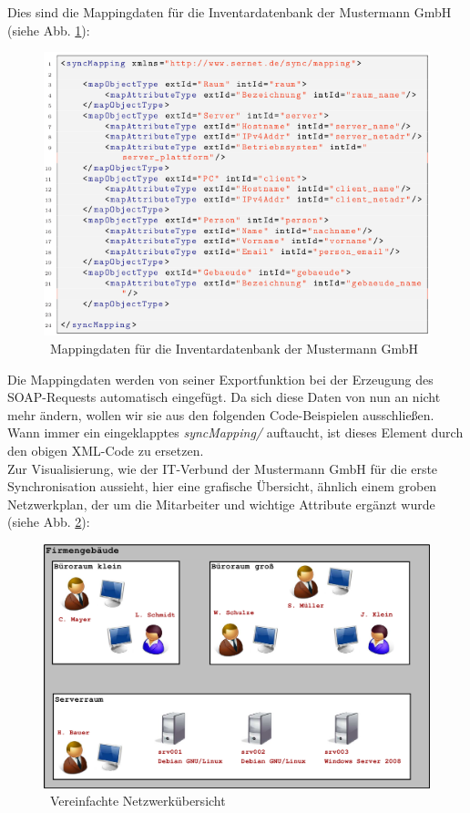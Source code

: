 \documentclass[a4paper,10pt]{book}
\begin{document}
Dies sind die Mappingdaten für die Inventardatenbank der Mustermann GmbH (siehe Abb. \ref{Mappingdaten fuer die Inventardatenbank}):
\newline
\begin{figure}[htb!]
  \centering
  \includegraphics[scale=.7]{Screenshot/SyncAPI_Fallstudie_03.png}
  \caption{\label{Mappingdaten fuer die Inventardatenbank} \ Mappingdaten für die Inventardatenbank der Mustermann GmbH}
\end{figure}
\newline
Die Mappingdaten werden von seiner Exportfunktion bei der Erzeugung des SOAP-Requests automatisch eingefügt.
Da sich diese Daten von nun an nicht mehr ändern, wollen wir sie aus den folgenden Code-Beispielen ausschließen.
Wann immer ein eingeklapptes \textit{syncMapping/} auftaucht, ist dieses Element durch den obigen
XML-Code zu ersetzen.
\newline\\
Zur Visualisierung, wie der IT-Verbund der Mustermann GmbH für die erste Synchronisation aussieht, hier eine grafische
Übersicht, ähnlich einem groben Netzwerkplan, der um die Mitarbeiter und wichtige Attribute ergänzt wurde (siehe Abb. \ref{Vereinfachte Netzwerkuebersicht}):
\newline
\begin{figure}[htb!]
  \centering
  \includegraphics[scale=.28]{Screenshot/Mustermann_snapshot01_03.png}
  \caption{\label{Vereinfachte Netzwerkuebersicht} \ Vereinfachte Netzwerkübersicht}
\end{figure}
\end{document}
